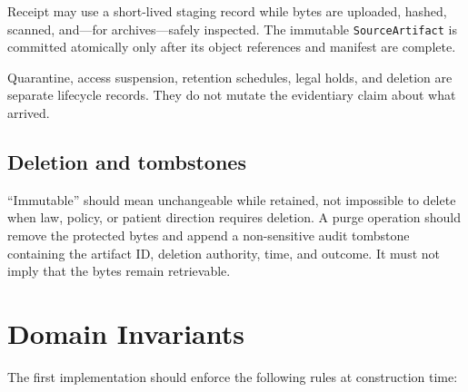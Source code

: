 \documentclass[11pt]{article}
\newcommand{\code}[1]{\texttt{#1}}
\begin{document}
\begin{center}
\end{center}

Receipt may use a short-lived staging record while bytes are uploaded, hashed, scanned, and---for archives---safely inspected. The immutable \code{SourceArtifact} is committed atomically only after its object references and manifest are complete.

Quarantine, access suspension, retention schedules, legal holds, and deletion are separate lifecycle records. They do not mutate the evidentiary claim about what arrived.

\subsection{Deletion and tombstones}

``Immutable'' should mean unchangeable while retained, not impossible to delete when law, policy, or patient direction requires deletion. A purge operation should remove the protected bytes and append a non-sensitive audit tombstone containing the artifact ID, deletion authority, time, and outcome. It must not imply that the bytes remain retrievable.

\section{Domain Invariants}

The first implementation should enforce the following rules at construction time:
\end{document}
